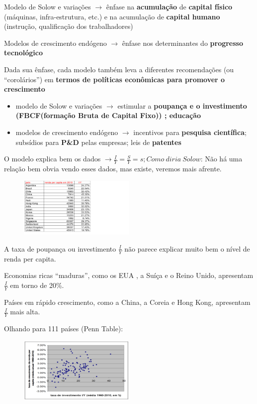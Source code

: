 \documentclass[a4paper,12pt]{article}[abntex2]
\begin{document}
Modelo de Solow e variações $\rightarrow$ ênfase na \textbf{acumulação} de \textbf{capital físico} (máquinas, infra-estrutura, etc.) e na acumulação de \textbf{capital humano} (instrução, qualificação dos trabalhadores)

Modelos de crescimento endógeno  $\rightarrow$ ênfase nos determinantes do \textbf{progresso tecnológico}

Dada sua ênfase, cada modelo também leva a diferentes recomendações (ou “corolários”) em \textbf{termos de políticas econômicas para promover o crescimento}\begin{itemize}
    \item modelo de Solow e variações  $\rightarrow$ estimular a \textbf{poupança e o investimento (FBCF(formação Bruta de Capital Fixo)) ; educação}
    \item modelos de crescimento endógeno  $\rightarrow$ incentivos para \textbf{pesquisa científica}; subsídios para \textbf{P\&D} pelas empresas; leis de \textbf{patentes}
\end{itemize}

O modelo explica bem os dados  $\rightarrow \frac{I}{Y}=\frac{S}{Y}=s ; Como \ diria \ Solow$:
Não há uma relação bem obvia vendo esses dados, mas existe, veremos mais afrente.

\begin{figure}[H]
        \centering
        \includegraphics[width=0.5\textwidth]{Imagens/a1i14.png}
\end{figure}

A taxa de poupança ou investimento $\frac{I}{Y}$ não parece explicar muito bem o nível de renda per capita.

Economias ricas “maduras”, como os EUA , a Suíça e o Reino Unido, apresentam $\frac{I}{Y}$ em torno de 20\%.

Países em rápido crescimento, como a China, a Coreia e Hong Kong, apresentam $\frac{I}{Y}$ mais alta.

Olhando para 111 países (Penn Table):

\begin{figure}[H]
        \centering
        \includegraphics[width=0.5\textwidth]{Imagens/a1i15.png}
\end{figure}
\end{document}
